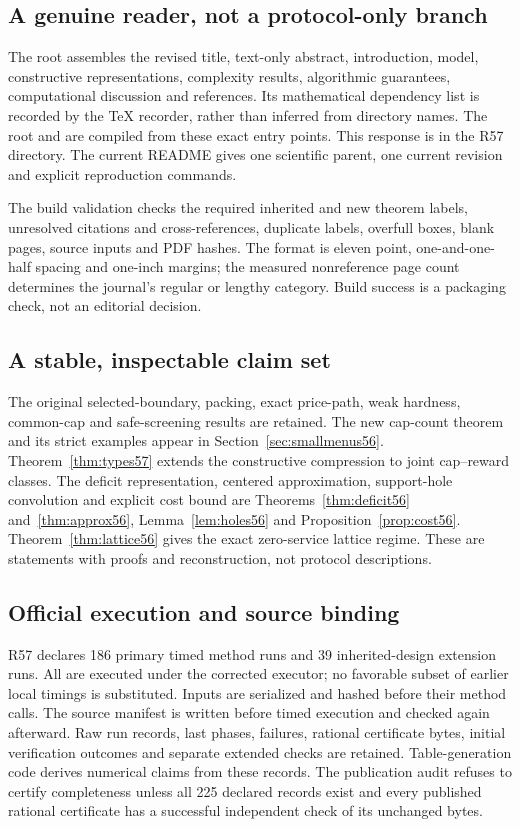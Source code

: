 \subsection{A genuine reader, not a protocol-only branch}
The root  assembles the revised title, text-only abstract, introduction, model, constructive representations, complexity results, algorithmic guarantees, computational discussion and references. Its mathematical dependency list is recorded by the TeX recorder, rather than inferred from directory names. The root  and  are compiled from these exact entry points. This response is  in the R57 directory. The current README gives one scientific parent, one current revision and explicit reproduction commands.

The build validation checks the required inherited and new theorem labels, unresolved citations and cross-references, duplicate labels, overfull boxes, blank pages, source inputs and PDF hashes. The format is eleven point, one-and-one-half spacing and one-inch margins; the measured nonreference page count determines the journal's regular or lengthy category. Build success is a packaging check, not an editorial decision.

\subsection{A stable, inspectable claim set}
The original selected-boundary, packing, exact price-path, weak hardness, common-cap and safe-screening results are retained. The new cap-count theorem and its strict examples appear in Section~\ref{sec:smallmenus56}. Theorem~\ref{thm:types57} extends the constructive compression to joint cap--reward classes. The deficit representation, centered approximation, support-hole convolution and explicit cost bound are Theorems~\ref{thm:deficit56} and~\ref{thm:approx56}, Lemma~\ref{lem:holes56} and Proposition~\ref{prop:cost56}. Theorem~\ref{thm:lattice56} gives the exact zero-service lattice regime. These are statements with proofs and reconstruction, not protocol descriptions.

\subsection{Official execution and source binding}
R57 declares 186 primary timed method runs and 39 inherited-design extension runs. All are executed under the corrected executor; no favorable subset of earlier local timings is substituted. Inputs are serialized and hashed before their method calls. The source manifest is written before timed execution and checked again afterward. Raw run records, last phases, failures, rational certificate bytes, initial verification outcomes and separate extended checks are retained. Table-generation code derives numerical claims from these records. The publication audit refuses to certify completeness unless all 225 declared records exist and every published rational certificate has a successful independent check of its unchanged bytes.

